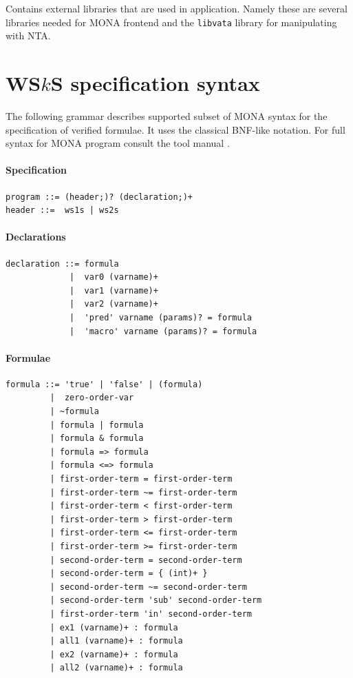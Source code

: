 Contains external libraries that are used in application. Namely these are
several libraries needed for \textsc{MONA} frontend and the \texttt{libvata}
library for manipulating with NTA.

\chapter{WS$k$S specification syntax}\label{syntax}

The following grammar describes supported subset of \textsc{MONA} syntax
for the specification of verified formulae. It uses the classical BNF-like
notation.
For full syntax for \textsc{MONA} program consult the tool manual \cite{monamanual}.

\subsubsection{Specification}
\begin{verbatim}
program ::= (header;)? (declaration;)+
header ::=  ws1s | ws2s
\end{verbatim}

\subsubsection{Declarations}
\begin{verbatim}
declaration ::= formula
             |  var0 (varname)+
             |  var1 (varname)+
             |  var2 (varname)+
             |  'pred' varname (params)? = formula
             |  'macro' varname (params)? = formula
\end{verbatim}

\subsubsection{Formulae}
\begin{verbatim}
formula ::= 'true' | 'false' | (formula)
         |  zero-order-var
         | ~formula
         | formula | formula
         | formula & formula
         | formula => formula
         | formula <=> formula
         | first-order-term = first-order-term 
         | first-order-term ~= first-order-term 
         | first-order-term < first-order-term 
         | first-order-term > first-order-term
         | first-order-term <= first-order-term 
         | first-order-term >= first-order-term
         | second-order-term = second-order-term
         | second-order-term = { (int)+ }
         | second-order-term ~= second-order-term
         | second-order-term 'sub' second-order-term
         | first-order-term 'in' second-order-term
         | ex1 (varname)+ : formula
         | all1 (varname)+ : formula
         | ex2 (varname)+ : formula
         | all2 (varname)+ : formula
\end{verbatim}

